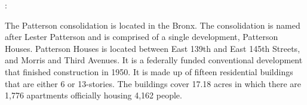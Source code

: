 :

The Patterson consolidation is located in the Bronx. The consolidation is named after Lester Patterson and is comprised of a single development, Patterson Houses. Patterson Houses is located between East 139th and East 145th Streets, and Morris and Third Avenues. It is a federally funded conventional development that finished construction in 1950. It is made up of fifteen residential buildings that are either 6 or 13-stories. The buildings cover 17.18 acres in which there are 1,776 apartments officially housing 4,162 people.